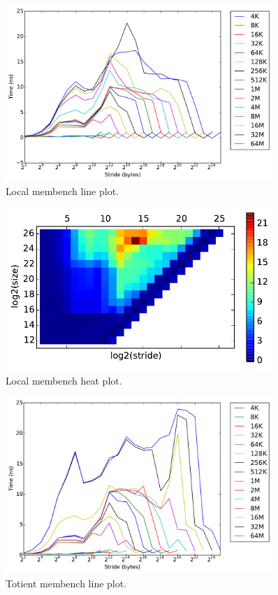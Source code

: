 \documentclass{hw}
\begin{document}
\begin{figure}[h]
  \centering
  \includegraphics[width=0.9\textwidth]{timings-line.pdf}
  \caption{Local membench line plot.}
  \label{fig:localtimingsline}
\end{figure}

\begin{figure}[h]
  \centering
  \includegraphics[width=0.9\textwidth]{timings-heat.pdf}
  \caption{Local membench heat plot.}
  \label{fig:localtimingsheat}
\end{figure}

\begin{figure}[h]
  \centering
  \includegraphics[width=0.9\textwidth]{timings-line-totient.pdf}
  \caption{Totient membench line plot.}
  \label{fig:totienttimingsline}
\end{figure}
\end{document}
